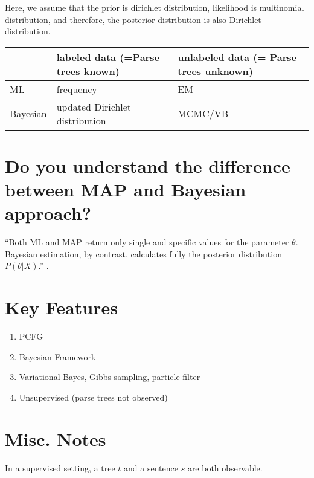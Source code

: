 \documentclass[11pt]{article}
\begin{document}
Here, we assume that the prior is dirichlet distribution, likelihood is multinomial distribution, and therefore, the posterior distribution is also Dirichlet distribution.

\begin{center}
    \begin{tabular}{|l|l|l|}
    \hline
             & labeled data (=Parse trees known) & unlabeled data (= Parse trees unknown)  \\\hline
    ML       & frequency                         & EM              \\\hline
    Bayesian & updated Dirichlet distribution    & MCMC/VB         \\\hline
    \end{tabular}
\end{center}

\section{Do you understand the difference between MAP and Bayesian approach?}
``Both ML and MAP return only single and specific values for the parameter $\theta$. Bayesian estimation, by contrast, calculates fully the posterior distribution $P(\theta|X)$.'' \cite{map_vs_bayesian}.

\section{Key Features}
\begin{enumerate}
 \item PCFG
 \item Bayesian Framework
 \item Variational Bayes, Gibbs sampling, particle filter
 \item Unsupervised (parse trees not observed)
\end{enumerate}

\section{Misc. Notes}
In a supervised setting, a tree $t$ and a sentence $s$ are both observable.
\end{document}
